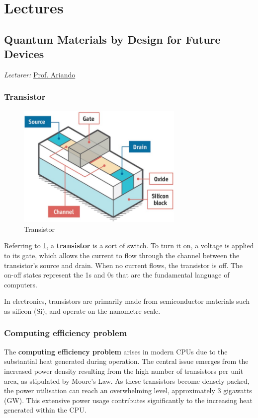 \documentclass[12pt,a4paper]{article}
\begin{document}
\section{Lectures}
\subsection{Quantum Materials by Design for Future Devices}
{\color{red}\textit{Lecturer:}} \href{https://www.physics.nus.edu.sg/faculty/ariando/}{Prof. Ariando}

\subsubsection{Transistor}
\begin{figure}[H]
    \centering
    \includegraphics[width=8cm]{images/transistor.jpg}
    \caption{Transistor}
    \label{fig:transistor}
\end{figure}

Referring to \cref{fig:transistor}, a \textbf{transistor} is a sort of switch. To turn it on, a voltage is applied to its gate, which allows the current to flow through the channel between the transistor's source and drain. When no current flows, the transistor is off. The on-off states represent the 1s and 0s that are the fundamental language of computers.

In electronics, transistors are primarily made from semiconductor materials such as silicon (Si), and operate on the nanometre scale.

\subsubsection{Computing efficiency problem}
The \textbf{computing efficiency problem} arises in modern CPUs due to the substantial heat generated during operation. The central issue emerges from the increased power density resulting from the high number of transistors per unit area, as stipulated by Moore's Law. As these transistors become densely packed, the power utilisation can reach an overwhelming level, approximately 3 gigawatts (GW). This extensive power usage contributes significantly to the increasing heat generated within the CPU.
\end{document}
